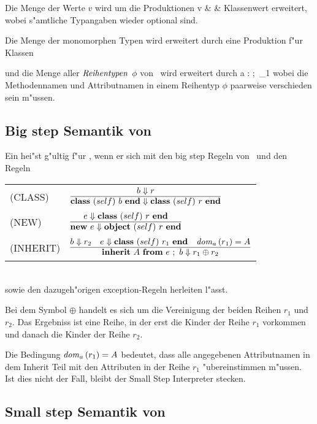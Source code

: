 Die Menge \notation{\Val} der Werte $v$ wird um die Produktionen
\bgram
v \is {}                                         & & \mbox{Klassenwert}
\egram
erweitert, wobei s"amtliche Typangaben wieder optional sind.

Die Menge der monomorphen Typen \notation{\Type} wird erweitert durch eine Produktion f"ur Klassen
\bgram
\tau \is \classtype{\tau}{\phi}
\egram

und die Menge \notation{$\TypeR$} aller ${\text{\it Reihentypen\/}}$ $\phi$ von \LTWOC\ wird erweitert durch
\bgram
\phi \is a : \tau;\ \phi_1
\egram
wobei die Methodennamen und Attributnamen in einem Reihentyp $\phi$ paarweise
verschieden sein m"ussen.


\subsection{Big step Semantik von \LTWOC}

Ein  hei"st g"ultig f"ur \LTWOC, wenn er sich mit den big step Regeln von \LTWOO\ und den Regeln\\[3mm]
  \begin{tabular}{ll}
    \mbox{(CLASS)}       & $\regel{b \eval r}
                                  {\class{self}{b} \eval \class{self}{r}}$ \\[5mm]
    \mbox{(NEW)}         & $\regel{e \eval \class{self}{r}}
                                  {\new{e} \eval \object{self}{r}}$ \\[5mm]
    \mbox{(INHERIT)}     & $\regel{b \eval r_2 \quad  e \eval \class{self}{r_1} \quad \doma{r_1} = A}
                                  {\inherit{A}{e}{b} \eval r_1 \oplus r_2}$
  \end{tabular}\\[7mm]
sowie den dazugeh"origen exception-Regeln herleiten l"asst.

Bei dem Symbol $\oplus$ handelt es sich um die Vereinigung der beiden Reihen $r_1$ und $r_2$.
Das Ergebniss ist eine Reihe, in der erst die Kinder der Reihe $r_1$ vorkommen und danach
die Kinder der Reihe $r_2$.

Die Bedingung ${\text{\it dom\/}}_a\,(r_1) = A$ bedeutet, dass alle angegebenen
Attributnamen in dem Inherit Teil mit den Attributen in der Reihe $r_1$ "ubereinstimmen m"ussen.
Ist dies nicht der Fall, bleibt der Small Step Interpreter stecken.

\subsection{Small step Semantik von \LTWOC}

